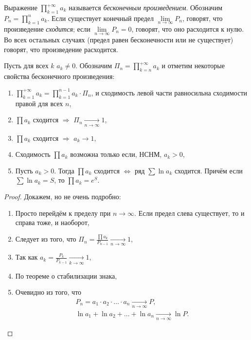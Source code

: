 \begin{definition}
	Выражение \(\prod\limits_{k=1}^{+\infty} a_k\) называется \textit{бесконечным произведением}. Обозначим \(P_n = \prod\limits_{k=1}^{n} a_k\). Если существует конечный предел \(\lim\limits_{n \to \infty} P_n\), говорят, что произведение \textit{сходится}; если \(\lim\limits_{n \to \infty} P_n = 0\), говорят, что оно расходится к нулю. Во всех остальных случаях (предел равен бесконечности или не существует) говорят, что произведение расходится.
\end{definition}

\begin{remark} \hypertarget{besk}{}
	Пусть для всех \(k\) \(a_k \neq 0\). Обозначим \(\Pi_n = \prod\limits_{k=n}^{+\infty} a_k\) и отметим некоторые свойства бесконечного произведения:
	\begin{enumerate}
		\item \(\prod\limits_{k=1}^{+\infty} a_k = \prod\limits_{k=1}^{n-1} a_k \cdot \Pi_n\), и сходимость левой части равносильна сходимости правой для всех \(n\),
		\item \(\prod a_k\) сходится \(\Rightarrow\) \(\Pi_n \xrightarrow[n \to \infty]{} 1\),
		\item \(\prod a_k\) сходится \(\Rightarrow\) \(a_k \to 1\),
		\item Сходимость \(\prod a_k\) возможна только если, НСНМ, \(a_k > 0\),
		\item Пусть \(a_k > 0\). Тогда \(\prod a_k\) сходится \(\Leftrightarrow\) ряд \(\sum \ln a_k\) сходится. Причём если \(\sum \ln a_k = S\), то \(\prod a_k = e^S\).
	\end{enumerate}
\end{remark}
\begin{proof}
	Докажем, но не очень подробно:
	\begin{enumerate}
		\item Просто перейдём к пределу при \(n \to \infty\). Если предел слева существует, то и справа тоже, и наоборот,
		\item Следует из того, что \(\Pi_n = \frac{\prod a_k}{P_{n-1}} \xrightarrow[n \to \infty]{} 1\),
		\item Так как \(a_k = \frac{P_k}{P_{k-1}} \xrightarrow[k \to \infty]{} 1\),
		\item По теореме о стабилизации знака,
		\item Очевидно из того, что 
		\begin{gather*}
			P_n = a_1 \cdot a_2 \cdot \ldots \cdot a_n \xrightarrow[n \to \infty]{} P, \\
			\ln a_1 + \ln a_2 + \ldots + \ln a_n \xrightarrow[n \to \infty]{} \ln P.
		\end{gather*}
	\end{enumerate}
\end{proof}

